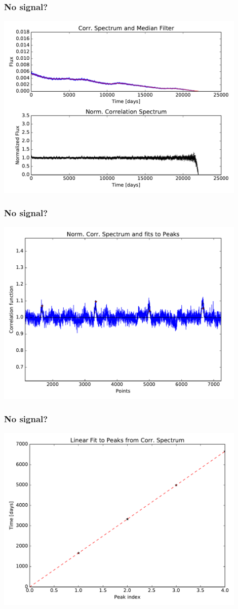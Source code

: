 \documentclass[notes]{beamer}
\begin{document}
\begin{frame}
\frametitle{No signal?}
\centering
\includegraphics[width=0.9\textwidth]{../figures/2019-1-15_16:2:14_normcurve_correlation_TIC89020549.pdf}
\end{frame}

\begin{frame}
\frametitle{No signal?}
\centering
\includegraphics[width=0.9\textwidth]{../figures/Corr-spektrum_zoom.pdf}
\end{frame}

\begin{frame}
\frametitle{No signal?}
\centering
\includegraphics[width=0.9\textwidth]{../figures/2019-1-15_16:2:14_linear_fit_TIC89020549.pdf}
\end{frame}
\end{document}
